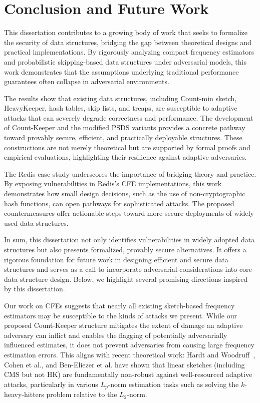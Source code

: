 \chapter{Conclusion and Future Work}\label{chap:conclusion}

This dissertation contributes to a growing body of work that seeks to formalize the security of data structures, bridging the gap between theoretical designs and practical implementations. By rigorously analyzing compact frequency estimators and probabilistic skipping-based data structures under adversarial models, this work demonstrates that the assumptions underlying traditional performance guarantees often collapse in adversarial environments.

The results show that existing data structures, including Count-min sketch, HeavyKeeper, hash tables, skip lists, and treaps, are susceptible to adaptive attacks that can severely degrade correctness and performance. The development of Count-Keeper and the modified PSDS variants provides a concrete pathway toward provably secure, efficient, and practically deployable structures. These constructions are not merely theoretical but are supported by formal proofs and empirical evaluations, highlighting their resilience against adaptive adversaries.

The Redis case study underscores the importance of bridging theory and practice. By exposing vulnerabilities in Redis’s CFE implementations, this work demonstrates how small design decisions, such as the use of non-cryptographic hash functions, can open pathways for sophisticated attacks. The proposed countermeasures offer actionable steps toward more secure deployments of widely-used data structures.

In sum, this dissertation not only identifies vulnerabilities in widely adopted data structures but also presents formalized, provably secure alternatives. It offers a rigorous foundation for future work in designing efficient and secure data structures and serves as a call to incorporate adversarial considerations into core data structure design. Below, we highlight several promising directions inspired by this dissertation.

Our work on CFEs suggests that nearly all existing sketch-based frequency estimators may be susceptible to the kinds of attacks we present. While our proposed Count-Keeper structure mitigates the extent of damage an adaptive adversary can inflict and enables the flagging of potentially adversarially influenced estimates, it does not prevent adversaries from causing large frequency estimation errors. This aligns with recent theoretical work: Hardt and Woodruff~\cite{hardt2013}, Cohen et al.\cite{cohen2022robust}, and Ben-Eliezer et al.\cite{BenEliezer2022} have shown that linear sketches (including CMS but not HK) are fundamentally non-robust against well-resourced adaptive attacks, particularly in various $L_p$-norm estimation tasks such as solving the $k$-heavy-hitters problem relative to the $L_2$-norm.

